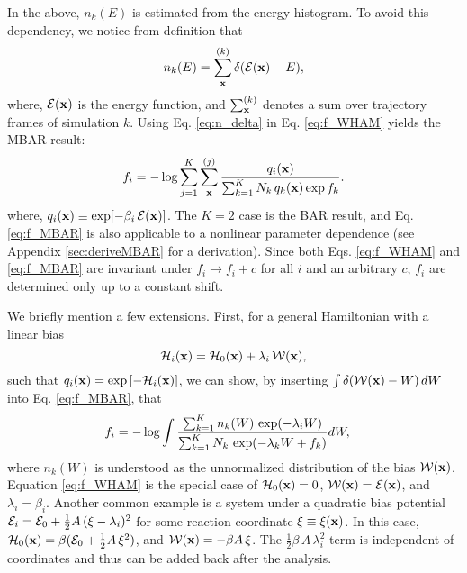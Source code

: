 \documentclass[reprint,aip,jcp,superscriptaddress]{revtex4-1}
\begin{document}
In the above,
$n_k(E)$ is estimated from the energy histogram.
%
To avoid this dependency,
we notice from definition that\cite{
souaille2001}
%
\begin{equation}
n_k(E)
=
\sum_{\mathbf{x}}^{(k)} \delta(\mathcal{E}(\mathbf{x}) - E),
\label{eq:n_delta}
\end{equation}
%
where,
$\mathcal{E}(\mathbf{x})$
is the energy function,
and
$\sum_{\mathbf{x}}^{(k)}$
denotes a sum over trajectory frames
of simulation $k$.
%
%
%
Using Eq. \eqref{eq:n_delta}
in Eq. \eqref{eq:f_WHAM} yields
the MBAR result\cite{
kumar1992, souaille2001, shirts2008}:
%
\begin{equation}
f_i
=
-\log
\sum_{j = 1}^K
\sum_{\mathbf{x}}^{(j)}
\frac{
  q_i(\mathbf{x})
}
{
  \sum_{k = 1}^K N_k \, q_k(\mathbf{x}) \exp f_k
}.
\label{eq:f_MBAR}
\end{equation}
%
where,
$q_i(\mathbf{x}) \equiv \exp[ -\beta_i \, \mathcal{E}(\mathbf{x}) ]$.
%
The $K = 2$ case is the BAR result\cite{
bennett1976},
and Eq. \eqref{eq:f_MBAR}
is also applicable to a nonlinear parameter dependence
(see Appendix \ref{sec:deriveMBAR}
for a derivation).
%
Since both Eqs. \eqref{eq:f_WHAM} and \eqref{eq:f_MBAR}
are invariant under $f_i \rightarrow f_i + c$
for all $i$ and an arbitrary $c$,
$f_i$ are determined only up to a constant shift.



We briefly mention a few extensions.
%
First,
for a general Hamiltonian
with a linear bias
\[
\mathcal{H}_i(\mathbf{x}) = \mathcal{H}_0(\mathbf{x}) + \lambda_i \, \mathcal{W}(\mathbf{x}),
\]
such that $q_i(\mathbf{x}) = \exp\left[ -\mathcal{H}_i(\mathbf{x}) \right]$,
%
we can show,
by inserting
$\int \delta(\mathcal{W}(\mathbf{x}) - W) \, dW$
into Eq. \eqref{eq:f_MBAR},
that
%
\begin{align}
f_i
&=
-\log
  \int
    \frac{
      \sum_{k = 1}^K n_k(W) \, \exp(-\lambda_i W)
    }
    {
      \sum_{k = 1}^K N_k \, \exp(-\lambda_k W + f_k)
    }
    d W,
\notag
\end{align}
%
where
$n_k(W)$
is understood as
the unnormalized distribution of
the bias $\mathcal{W}(\mathbf{x})$.
%
Equation \eqref{eq:f_WHAM}
is the special case of
$\mathcal{H}_0(\mathbf{x}) = 0$,
$\mathcal{W}(\mathbf{x}) = \mathcal{E}(\mathbf{x})$,
and $\lambda_i = \beta_i$.
%
Another common example
is a system under a quadratic bias potential
$\mathcal{E}_i = \mathcal{E}_0 + \frac 1 2 A \, (\xi - \lambda_i)^2$
for some reaction coordinate $\xi \equiv \xi(\mathbf{x})$.
%
In this case,
$\mathcal{H}_0(\mathbf{x}) = \beta (\mathcal{E}_0 + \frac 1 2 A \, \xi^2)$,
and
$\mathcal{W}(\mathbf{x}) = -\beta A \, \xi$.
%
The $\frac 1 2 \beta \, A \, \lambda_i^2$ term
is independent of coordinates
and thus can be added back after the analysis.
\end{document}

